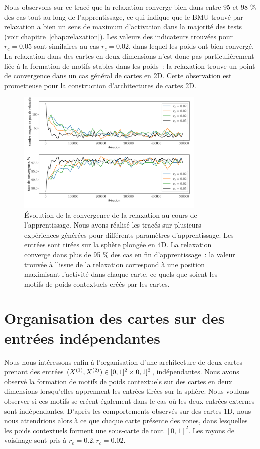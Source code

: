 \documentclass[../main]{subfiles}
\begin{document}
Nous observons sur ce tracé que la relaxation converge bien dans entre 95 et 98 \% des cas tout au long de l'apprentissage, ce qui indique que le BMU trouvé par relaxation a bien un sens de maximum d'activation dans la majorité des tests (voir chapitre~\ref{chap:relaxation}).
Les valeurs des indicateurs trouvées pour $r_c = 0.05$ sont similaires au cas $r_c = 0.02$, dans lequel les poids ont bien convergé. La relaxation dans des cartes en deux dimensions n'est donc pas particulièrement liée à la formation de motifs stables dans les poids~: la relaxation trouve un point de convergence dans un cas général de cartes en 2D. Cette observation est prometteuse pour la construction d'architectures de cartes 2D.
\begin{figure}
	\centering
	\includegraphics[width=0.8\textwidth]{conv_relax_2maps.pdf}
	\vspace{-0.5cm}
	\caption{\'Evolution de la convergence de la relaxation au cours de l'apprentissage. Nous avons réalisé les tracés sur plusieurs expériences générées pour différents paramètres d'apprentissage. Les entrées sont tirées sur la sphère plongée en 4D. 
	La relaxation converge dans plus de 95 \% des cas en fin d'apprentissage~: la valeur trouvée à l'issue de la relaxation correspond à une position maximisant l'activité dans chaque carte, ce quels que soient les motifs de poids contextuels créés par les cartes. \label{fig:relax2D}}
\end{figure}

\section{Organisation des cartes sur des entrées indépendantes \label{par:cub2D}}

Nous nous intéressons enfin à l'organisation d'une architecture de deux cartes prenant des entrées $(X^{({1})}, X^{({2})}) \in [0,1]^2 \times 0,1]^2$, indépendantes.
Nous avons observé la formation de motifs de poids contextuels sur des cartes en deux dimensions lorsqu'elles apprennent les entrées tirées sur la sphère. Nous voulons observer si ces motifs se créent également dans le cas où les deux entrées externes sont indépendantes.
D'après les comportements observés sur des cartes 1D, nous nous attendrions alors à ce que chaque carte présente des zones, dans lesquelles les poids contextuels forment une sous-carte de tout $[0,1]^2$.
Les rayons de voisinage sont pris à $r_e = 0.2, r_c = 0.02$.
\end{document}
